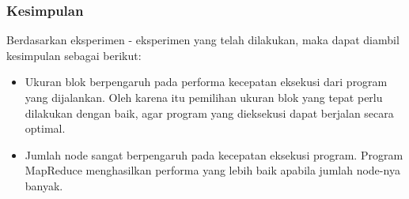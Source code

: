 \subsubsection{Kesimpulan}
Berdasarkan eksperimen - eksperimen yang telah dilakukan, maka dapat diambil kesimpulan sebagai berikut:

\begin{itemize}
	\item Ukuran blok berpengaruh pada performa kecepatan eksekusi dari program yang dijalankan. Oleh karena itu pemilihan ukuran blok yang tepat perlu dilakukan dengan baik, agar program yang dieksekusi dapat berjalan secara optimal.
	\item Jumlah node sangat berpengaruh pada kecepatan eksekusi program. Program MapReduce menghasilkan performa yang lebih baik apabila jumlah node-nya banyak.
\end{itemize}